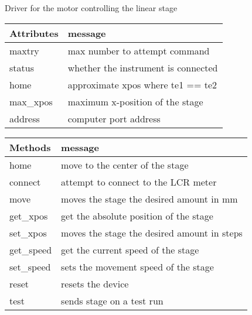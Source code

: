 \documentclass[letterpaper,10pt,english]{sphinxmanual}
\begin{document}
\begin{fulllineitems}
\label{\detokenize{drivers:drivers.Motor}}
Driver for the motor controlling the linear stage


\begin{savenotes}\sphinxattablestart
\centering
\begin{tabulary}{\linewidth}[t]{|T|T|}
\hline
\sphinxstyletheadfamily 
Attributes
&\sphinxstyletheadfamily 
message
\\
\hline
maxtry
&
max number to attempt command
\\
\hline
status
&
whether the instrument is connected
\\
\hline
home
&
approximate xpos where te1 == te2
\\
\hline
max\_xpos
&
maximum x-position of the stage
\\
\hline
address
&
computer port address
\\
\hline
\end{tabulary}
\par
\sphinxattableend\end{savenotes}


\begin{savenotes}\sphinxattablestart
\centering
\begin{tabulary}{\linewidth}[t]{|T|T|}
\hline
\sphinxstyletheadfamily 
Methods
&\sphinxstyletheadfamily 
message
\\
\hline
home
&
move to the center of the stage
\\
\hline
connect
&
attempt to connect to the LCR meter
\\
\hline
move
&
moves the stage the desired amount in mm
\\
\hline
get\_xpos
&
get the absolute position of the stage
\\
\hline
set\_xpos
&
moves the stage the desired amount in steps
\\
\hline
get\_speed
&
get the current speed of the stage
\\
\hline
set\_speed
&
sets the movement speed of the stage
\\
\hline
reset
&
resets the device
\\
\hline
test
&
sends stage on a test run
\\
\hline
\end{tabulary}
\par
\sphinxattableend\end{savenotes}


\end{fulllineitems}
\end{document}
